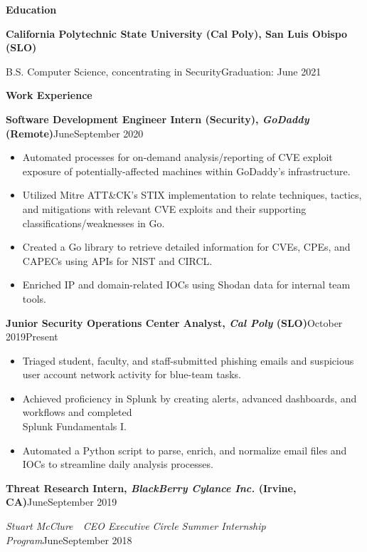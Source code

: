 \documentclass[10.5pt]{article}
\newcommand{\resumesection}[2]{
  \vspace{1em}
  \noindent\Large{\textbf{#1}}\hfill\normalsize{#2}
}
\newcommand{\resumelistitem}[1]{
  \item{\normalsize{#1}}
}
\newcommand{\resumejobtitle}[5]{
  \vspace{0.6em}
  \noindent\large{\textbf{#1, \textit{#2} (#3)}}\hfill\normalsize{#4\textemdash#5}
}
\begin{document}
  \pagestyle{resumeheader}

  \resumesection{Education}{~}

    \indent\textbf{California Polytechnic State University (Cal Poly), San Luis Obispo (SLO)}

    \indent\indent\small{B.S. Computer Science, concentrating in Security}\hfill\normalsize{Graduation: June 2021}

  \resumesection{Work Experience}{~}

    \resumejobtitle{Software Development Engineer Intern (Security)}{GoDaddy}{Remote}{June}{September 2020}

    \begin{itemize}
      \setlength{\itemsep}{0.15pt}
      \resumelistitem{Automated processes for on-demand analysis/reporting of CVE exploit exposure of potentially-affected machines within GoDaddy's infrastructure.}
      \resumelistitem{Utilized Mitre ATT\&CK's STIX implementation to relate
        techniques, tactics, and mitigations with relevant CVE
        exploits and their supporting classifications/weaknesses in Go.}
      \resumelistitem{Created a Go library to retrieve detailed information for
        CVEs, CPEs, and CAPECs using APIs for NIST and CIRCL.}
      \resumelistitem{Enriched IP and domain-related IOCs using Shodan data for internal team tools.}
    \end{itemize}

    \resumejobtitle{Junior Security Operations Center Analyst}{Cal Poly}{SLO}{October 2019}{Present}

    \begin{itemize}
      \setlength{\itemsep}{0.15pt}
      \resumelistitem{Triaged student, faculty, and staff-submitted phishing emails and suspicious user account network activity for blue-team tasks.}
      \resumelistitem{Achieved proficiency in Splunk by creating alerts, advanced dashboards, and workflows and completed \\ Splunk Fundamentals I.}
      \resumelistitem{Automated a Python script to parse, enrich, and normalize email files and IOCs to streamline daily analysis processes.}
    \end{itemize}

    \resumejobtitle{Threat Research Intern}{BlackBerry Cylance Inc.}{Irvine, CA}{June}{September 2019}

    \noindent\small\textit{Stuart McClure~\textemdash~CEO Executive Circle Summer Internship Program}\hfill\normalsize{June\textemdash September 2018}
\end{document}
